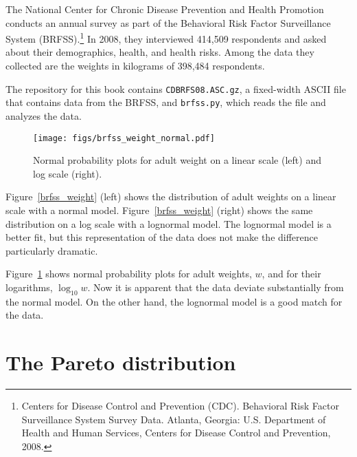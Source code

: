 \documentclass[12pt]{book}
\begin{document}
The National Center for Chronic Disease
Prevention and Health Promotion conducts an annual survey as part of
the Behavioral Risk Factor Surveillance System
(BRFSS).\footnote{Centers for Disease Control and Prevention
  (CDC). Behavioral Risk Factor Surveillance System Survey
  Data. Atlanta, Georgia: U.S. Department of Health and Human
  Services, Centers for Disease Control and Prevention, 2008.}  In
2008, they interviewed 414,509 respondents and asked about their
demographics, health, and health risks.
Among the data they collected are the weights in kilograms of
398,484 respondents.

The repository for this book contains {\tt CDBRFS08.ASC.gz},
a fixed-width ASCII file that contains data from the BRFSS,
and {\tt brfss.py}, which reads the file and analyzes the data.

\begin{figure}
\centerline{
\texttt{[image: figs/brfss\_weight\_normal.pdf]}}
\caption{Normal probability plots for adult weight on a linear scale
  (left) and log scale (right).}
\label{brfss_weight_normal}
\end{figure}

Figure~\ref{brfss_weight} (left) shows the distribution of adult
weights on a linear scale with a normal model.
Figure~\ref{brfss_weight} (right) shows the same distribution on a log
scale with a lognormal model.  The lognormal model is a better fit,
but this representation of the data does not make the difference
particularly dramatic.   

Figure~\ref{brfss_weight_normal} shows normal probability plots for
adult weights, $w$, and for their logarithms, $\log_{10} w$.  Now it
is apparent that the data deviate substantially from the normal model.
On the other hand, the lognormal model is a good match for the data.
 
 
 
  
 


\section{The Pareto distribution}
\end{document}
